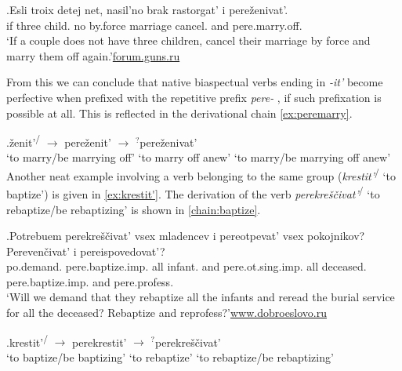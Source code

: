 \exg.\label{ex:perezenivat'}Esli troix detej net, nasil'no brak rastorgat' i pere\v{z}enivat'.\\
if three child. no by.force marriage cancel. and pere.marry.off.\\
\trans `If a couple does not have three children, cancel their marriage by force and marry them off again.'\hbox{}\hfill\hbox{\url{forum.guns.ru}}

From this we can conclude that native biaspectual verbs   ending in \textit{-it'} become perfective when prefixed with the repetitive  prefix \textit{pere-}  , if such prefixation  is possible at all. This is reflected in the derivational chain \ref{ex:peremarry}.

\exg.\label{ex:peremarry}\v{z}enit'\textsuperscript{\IPF\slash\PF} $\rightarrow$ pere\v{z}enit'\textsuperscript{\PF} $\rightarrow$ $^?$pere\v{z}enivat'\textsuperscript{\IPF} \\
{`to marry/be marrying off'} {} {`to marry off anew'} {} {`to marry/be marrying off anew'}\\

Another neat example involving a verb belonging to the same group (\textit{krestit'}\textsuperscript{\IPF\slash\PF} `to baptize') is given in \ref{ex:krestit'}. The derivation of the verb \textit{perekre\v{s}\v{c}ivat'}\textsuperscript{\IPF\slash\PF} `to rebaptize/be rebaptizing' is shown in \ref{chain:baptize}.

\exg.\label{ex:krestit'}Potrebuem perekre\v{s}\v{c}ivat' vsex mladencev i pereotpevat' vsex pokojnikov? Pereven\v{c}ivat' i pereispovedovat'?\\
po.demand. pere.baptize.imp. all infant. and pere.ot.sing.imp. all deceased. pere.baptize.imp. and pere.profess.\\
\trans `Will we demand that they rebaptize all the infants and reread the burial service for all the deceased? Rebaptize and reprofess?'\hbox{}\hfill\hbox{\url{www.dobroeslovo.ru}}


\exg.\label{chain:baptize}krestit'\textsuperscript{\IPF\slash\PF} $\rightarrow$ perekrestit'\textsuperscript{\PF} $\rightarrow$ $^?$perekre\v{s}\v{c}ivat'\textsuperscript{\IPF}\\
{`to baptize/be baptizing'} {} {`to rebaptize'} {} {`to rebaptize/be rebaptizing'}\\

